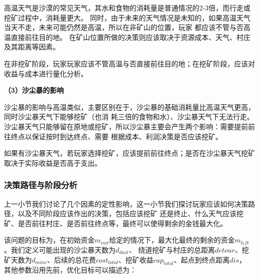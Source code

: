 \documentclass[withoutpreface,bwprint]{cumcmthesis} %
\begin{document}
高温天气是沙漠的常见天气，其水和食物的消耗量是普通情况的2-3倍，而行走或挖矿过程中，消耗量更大。
同时，由于未来的天气情况是未知的，如果高温天气当天不走，未来可能仍然是高温，所以在非矿山的位置，玩家
都应该不管与否高温直接前往目的地。
在矿山位置所做的决策则应该取决于资源成本、天气、村庄及其距离等因素。


\begin{stratygy}
    在非挖矿阶段，玩家玩家应该不管高温与否直接前往目的地；在挖矿阶段，应该对收益与成本进行量化分析。
    \label{str:hot}
\end{stratygy}

\textbf{（3）沙尘暴的影响}

沙尘暴的影响与高温类似，主要区别在于，沙尘暴的基础消耗量比高温天气更高，同时沙尘暴天气下能够挖矿（也消
耗三倍的食物和水）、沙尘暴天气下无法行走。
沙尘暴天气只能够留在原地或挖矿，所以沙尘暴主要会产生两个影响：需要提前前往终点以保证按时到达终点、需要
根据成本、利润决策是否应该挖矿。

\begin{stratygy}
    如果有沙尘暴天气，若玩家选择挖矿，应该提前前往终点；是否在沙尘暴天气挖矿取决于实际收益是否高于支出。
    \label{str:dust}
\end{stratygy}

\subsubsection{决策路径与阶段分析}


上一小节我们讨论了几个因素的定性影响，这一小节我们探讨玩家应该如何决策路径，以及不同阶段应该作出的决策，包括应该挖矿
还是终止、什么天气应该挖矿、是否前往村庄、是否前往终点等，最终可以使得剩余的金钱最大化。

该问题的目标为，在初始资金$m_{init}$给定的情况下，最大化最终的剩余的资金$m_{left}$。我们定义可能出现的沙尘暴天数为$d_{dust}$、
绕道挖矿与村庄的总距离$detour$、挖矿天数为$d_{mine}$、后续的总花费$cost_{total}$、挖矿收益$cap_{total}$、起点到终点距离$dis$，
其他参数沿用先前，优化目标可以描述为：
\end{document}
